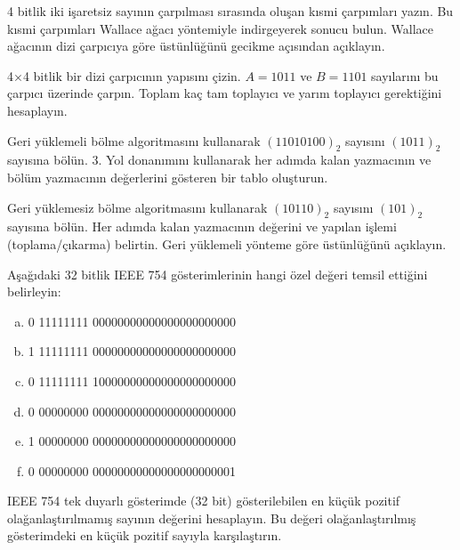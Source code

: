 \begin{alistirma}[\zor]
4 bitlik iki işaretsiz sayının çarpılması sırasında oluşan kısmi çarpımları yazın. Bu kısmi çarpımları Wallace ağacı yöntemiyle indirgeyerek sonucu bulun. Wallace ağacının dizi çarpıcıya göre üstünlüğünü gecikme açısından açıklayın.
\end{alistirma}

\begin{alistirma}[\orta]
4$\times$4 bitlik bir dizi çarpıcının yapısını çizin. $A = 1011$ ve $B = 1101$ sayılarını bu çarpıcı üzerinde çarpın. Toplam kaç tam toplayıcı ve yarım toplayıcı gerektiğini hesaplayın.
\end{alistirma}

\begin{alistirma}[\orta]
Geri yüklemeli bölme algoritmasını kullanarak $(11010100)_2$ sayısını $(1011)_2$ sayısına bölün. 3. Yol donanımını kullanarak her adımda kalan yazmacının ve bölüm yazmacının değerlerini gösteren bir tablo oluşturun.
\end{alistirma}

\begin{alistirma}[\orta]
Geri yüklemesiz bölme algoritmasını kullanarak $(10110)_2$ sayısını $(101)_2$ sayısına bölün. Her adımda kalan yazmacının değerini ve yapılan işlemi (toplama/çıkarma) belirtin. Geri yüklemeli yönteme göre üstünlüğünü açıklayın.
\end{alistirma}

\begin{alistirma}[\kolay]
Aşağıdaki 32 bitlik IEEE 754 gösterimlerinin hangi özel değeri temsil ettiğini belirleyin:
\begin{enumerate}[(a)]
\item 0 11111111 00000000000000000000000
\item 1 11111111 00000000000000000000000
\item 0 11111111 10000000000000000000000
\item 0 00000000 00000000000000000000000
\item 1 00000000 00000000000000000000000
\item 0 00000000 00000000000000000000001
\end{enumerate}
\end{alistirma}

\begin{alistirma}[\kolay]
IEEE 754 tek duyarlı gösterimde (32 bit) gösterilebilen en küçük pozitif olağanlaştırılmamış sayının değerini hesaplayın. Bu değeri olağanlaştırılmış gösterimdeki en küçük pozitif sayıyla karşılaştırın.
\end{alistirma}

